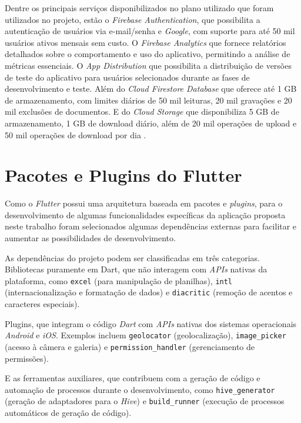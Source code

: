 Dentre os principais serviços disponibilizados no plano utilizado que foram utilizados no projeto, estão o \textit{Firebase Authentication}, 
que possibilita a autenticação de usuários via e-mail/senha e \textit{Google}, com suporte 
para até 50 mil usuários ativos mensais sem custo. O \textit{Firebase Analytics} que fornece 
relatórios detalhados sobre o comportamento e uso do aplicativo, permitindo a 
análise de métricas essenciais. O \textit{App Distribution} que possibilita a distribuição de versões 
de teste do aplicativo para usuários selecionados durante as fases de desenvolvimento e teste. 
Além do \textit{Cloud Firestore Database} que oferece até 1 GB de armazenamento, com limites diários de 50 
mil leituras, 20 mil gravações e 20 mil exclusões de documentos. E do \textit{Cloud Storage} que
disponibiliza 5 GB de armazenamento, 1 GB de download diário, além de 20 mil operações 
de upload e 50 mil operações de download por dia \cite{firebase2025}.

\section{Pacotes e Plugins do Flutter}

Como o \textit{Flutter} possui uma arquitetura baseada em pacotes e \textit{plugins}, para o desenvolvimento 
de algumas funcionalidades específicas da aplicação proposta neste trabalho foram selecionados 
algumas dependências externas para facilitar e aumentar as possibilidades de desenvolvimento.

As dependências do projeto podem ser classificadas em três categorias. Bibliotecas puramente em Dart, 
que não interagem com \textit{APIs} nativas da 
plataforma, como \texttt{excel} (para manipulação de planilhas), \texttt{intl} (internacionalização 
e formatação de dados) e \texttt{diacritic} (remoção de acentos e caracteres especiais).

Plugins, que integram o código \textit{Dart} com \textit{APIs} nativas dos 
sistemas operacionais \textit{Android} e \textit{iOS}. Exemplos incluem \texttt{geolocator}
 (geolocalização), 
\texttt{image\_picker} (acesso à câmera e galeria) e \texttt{permission\_handler} (gerenciamento 
de permissões).

E as ferramentas auxiliares, que contribuem com a geração 
de código e automação de processos durante o desenvolvimento, como \texttt{hive\_generator} 
(geração de adaptadores para o \textit{Hive}) e \texttt{build\_runner} (execução de processos automáticos de 
geração de código).

